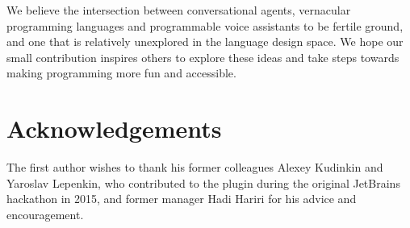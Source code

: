 \documentclass[conference]{IEEEtran}
\begin{document}
We believe the intersection between conversational agents, vernacular programming languages and programmable voice assistants to be fertile ground, and one that is relatively unexplored in the language design space. We hope our small contribution inspires others to explore these ideas and take steps towards making programming more fun and accessible.

\section{Acknowledgements}

The first author wishes to thank his former colleagues Alexey Kudinkin and Yaroslav Lepenkin, who contributed to the plugin during the original JetBrains hackathon in 2015, and former manager Hadi Hariri for his advice and encouragement.


\end{document}
